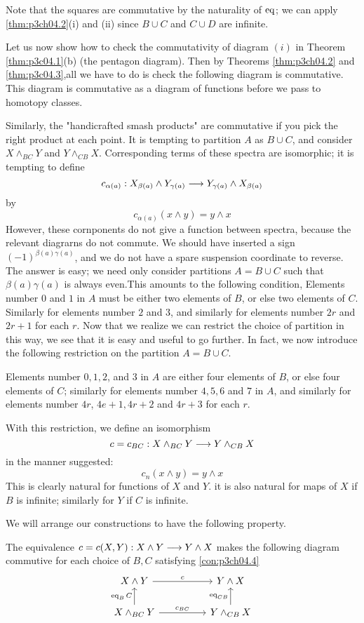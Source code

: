 \documentclass[../main]{subfiles}
\begin{document}
Note that the squares are commutative by the naturality of $\mathop{\mathrm{eq}}$; we can apply \ref{thm:p3ch04.2}(i) and (ii) since $B\cup C$ and $C\cup D$ are infinite.

Let us now show how to check the commutativity of diagram $(i)$ in Theorem \ref{thm:p3c04.1}(b) (the pentagon diagram). Then by Theorems \ref{thm:p3ch04.2} and \ref{thm:p3c04.3},all we have to do is check the following diagram is commutative.
This diagram is commutative as a diagram of functions before we pass to homotopy classes.

Similarly, the "handicrafted smash products" are commutative if
you pick the right product at each point. It is tempting to partition $A$ as $B\cup C$, and consider $X\wedge_{BC}Y$ and $Y\wedge_{CB}X$. Corresponding terms
of these spectra are isomorphic; it is tempting to define 
$$c_{\alpha(a)} :X_{\beta(a)}\wedge Y_{\gamma(a)}\overset{}{\longrightarrow} Y_{\gamma(a)}\wedge X_{\beta(a)}$$
by $$c_{\alpha(a)} (x\wedge y)=y\wedge x$$
However, these cornponents do not give a function between spectra, because the relevant diagrarns do not commute. We should have inserted a sign  $(-1)^{\beta(a)\gamma(a)}$, and we do not have a spare suspension coordinate to
reverse. The answer is easy; we need only consider partitions $A=B\cup C$ such that $ \beta(a)\gamma(a)$ is always even.This amounts to the
following condition, Elements number $0$ and $1$ in $A$ must be either two
 elements of $B$, or else two elements of $C$. Similarly for elements
number $2$ and $3$, and similarly for elements number $2r$ and $2r+1$ for
each $r$.
Now that we realize we can restrict the choice of partition in this way,
we see that it is easy and useful to go further. In fact, we now introduce
the following restriction on the partition $A = B\cup C$.
\begin{condition}\label{con:p3ch04.4}
Elements number $0,1,2$, and $3$ in $A$ are either
four elements of $B$, or else four elements of $C$; similarly for elements
number $4,5,6$ and $7$ in $A$, and similarly for elements number $4r$,
$4e+1, 4r+2$ and $4r+3$ for each $r$. 
\end{condition}
With this restriction, we define an isomorphism 
$$ c=c_{BC}:X\wedge_{BC}Y \overset{}{\longrightarrow} Y\wedge_{CB}X$$
in the manner suggested:
$$c_n(x\wedge y)= y\wedge x$$
This is clearly natural for functions of $X$ and $Y$. it is also natural for maps of $X$ if $B$ is infinite; similarly for $Y$ if $C$ is infinite.

We will arrange our constructions to have the following property.
\begin{theorem}\label{thm:p3ch04.5}
The equivalence $c=c(X,Y):X\wedge Y\overset{}{\longrightarrow}Y\wedge X$ makes the following diagram commutive for each choice of $B,C$ satisfying \ref{con:p3ch04.4}
$$\begin{tikzcd}
X\wedge Y \arrow[rr,"c"]&& Y\wedge X\\ X\wedge_{BC} Y\arrow[u,"\te{eq}_BC"]\arrow[rr,"c_{BC}"]&&Y\wedge_{CB}X\arrow[u,"\te{eq}_{CB}"]
\end{tikzcd}$$
    
\end{theorem}
\end{document}
